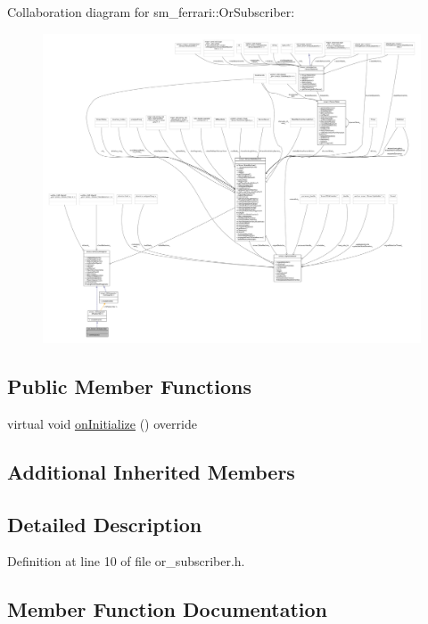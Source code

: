 Collaboration diagram for sm\+\_\+ferrari\+:\+:Or\+Subscriber\+:
\nopagebreak
\begin{figure}[H]
\begin{center}
\leavevmode
\includegraphics[width=350pt]{classsm__ferrari_1_1OrSubscriber__coll__graph}
\end{center}
\end{figure}
\subsection*{Public Member Functions}
\begin{DoxyCompactItemize}
\item 
virtual void \hyperlink{classsm__ferrari_1_1OrSubscriber_afa3ea8376b984ed480eb4d1f12fa3a1f}{on\+Initialize} () override
\end{DoxyCompactItemize}
\subsection*{Additional Inherited Members}


\subsection{Detailed Description}


Definition at line 10 of file or\+\_\+subscriber.\+h.



\subsection{Member Function Documentation}
\mbox{\label{classsm__ferrari_1_1OrSubscriber_afa3ea8376b984ed480eb4d1f12fa3a1f}} 
